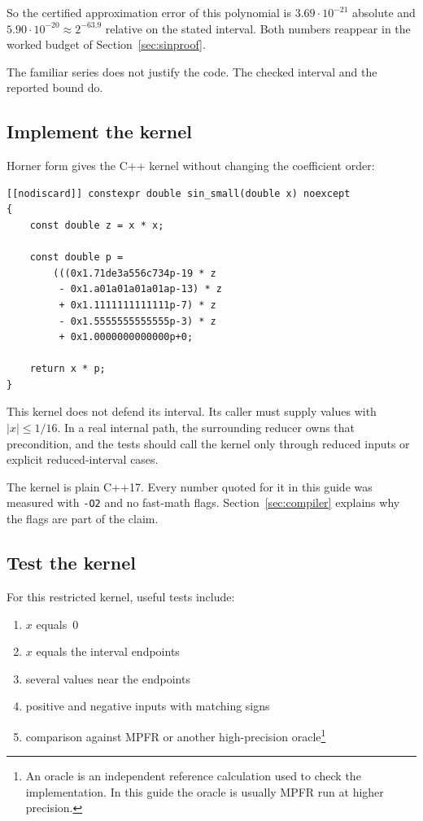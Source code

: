 \documentclass[manuscript, nonacm]{acmart}
\begin{document}
    So the certified approximation error of this polynomial is
    $3.69 \cdot 10^{-21}$ absolute and $5.90 \cdot 10^{-20} \approx 2^{-63.9}$
    relative on the stated interval. Both numbers reappear in the worked
    budget of Section~\ref{sec:sinproof}.

    The familiar series does not justify the code. The checked interval and the
    reported bound do.

    \subsection{Implement the kernel}

    Horner form gives the C++ kernel without changing the coefficient order:
    \begin{lstlisting}[style=cpp]
[[nodiscard]] constexpr double sin_small(double x) noexcept
{
    const double z = x * x;

    const double p =
        (((0x1.71de3a556c734p-19 * z
         - 0x1.a01a01a01a01ap-13) * z
         + 0x1.1111111111111p-7) * z
         - 0x1.5555555555555p-3) * z
         + 0x1.0000000000000p+0;

    return x * p;
}
    \end{lstlisting}

    This kernel does not defend its interval. Its caller must supply values with
    $|x| \le 1/16$. In a real internal path, the surrounding reducer owns that
    precondition, and the tests should call the kernel only through reduced
    inputs or explicit reduced-interval cases.

    The kernel is plain C++17. Every number quoted for it in this guide was
    measured with \texttt{-O2} and no fast-math flags.
    Section~\ref{sec:compiler} explains why the flags are part of the claim.

    \subsection{Test the kernel}

    For this restricted kernel, useful tests include:

    \begin{enumerate}
        \item $x$ equals~$0$
        \item $x$ equals the interval endpoints
        \item several values near the endpoints
        \item positive and negative inputs with matching signs
        \item comparison against MPFR or another high-precision oracle\footnote{An oracle is an independent reference calculation used to check the implementation. In this guide the oracle is usually MPFR run at higher precision.}
    \end{enumerate}
\end{document}
